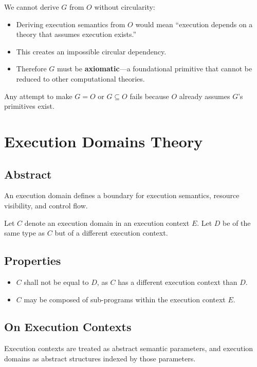 \documentclass[11pt,a4paper]{article}
\begin{document}
We cannot derive $G$ from $O$ without circularity:
\begin{itemize}
    \item Deriving execution semantics from $O$ would mean ``execution depends on a theory that assumes execution exists.''
    \item This creates an impossible circular dependency.
    \item Therefore $G$ must be \textbf{axiomatic}—a foundational primitive that cannot be reduced to other computational theories.
\end{itemize}

Any attempt to make $G = O$ or $G \subseteq O$ fails because $O$ already assumes $G$'s primitives exist.

\section{Execution Domains Theory}

\subsection{Abstract}

An execution domain defines a boundary for execution semantics, resource visibility, and control flow.

Let $C$ denote an execution domain in an execution context $E$. Let $D$ be of the same type as $C$ but of a different execution context.

\subsection{Properties}

\begin{itemize}
    \item $C$ shall not be equal to $D$, as $C$ has a different execution context than $D$.
    \item $C$ may be composed of sub-programs within the execution context $E$.
\end{itemize}

\subsection{On Execution Contexts}

Execution contexts are treated as abstract semantic parameters, and execution domains as abstract structures indexed by those parameters.
\end{document}

